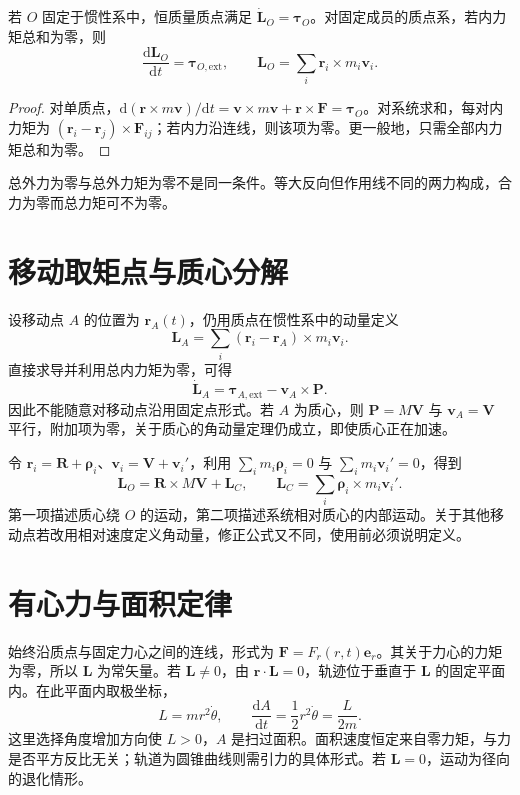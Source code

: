 \documentclass[UTF8,12pt,a4paper,fontset=fandol]{ctexbook}
\begin{document}
\begin{theorem}[关于惯性系固定点的角动量定理]
若 $O$ 固定于惯性系中，恒质量质点满足 $\dot{\mathbf L}_O=\boldsymbol\tau_O$。对固定成员的质点系，若内力矩总和为零，则
\begin{equation}
 \frac{\mathrm d\mathbf L_O}{\mathrm dt}=\boldsymbol\tau_{O,\mathrm{ext}},\qquad
 \mathbf L_O=\sum_i\mathbf r_i\times m_i\mathbf v_i.
 \label{eq:mech-angular-balance}
\end{equation}
\end{theorem}
\begin{proof}
对单质点，$\mathrm d(\mathbf r\times m\mathbf v)/\mathrm dt=\mathbf v\times m\mathbf v+\mathbf r\times\mathbf F=\boldsymbol\tau_O$。对系统求和，每对内力矩为 $(\mathbf r_i-\mathbf r_j)\times\mathbf F_{ij}$；若内力沿连线，则该项为零。更一般地，只需全部内力矩总和为零。
\end{proof}
总外力为零与总外力矩为零不是同一条件。等大反向但作用线不同的两力构成，合力为零而总力矩可不为零。

\section{移动取矩点与质心分解}
设移动点 $A$ 的位置为 $\mathbf r_A(t)$，仍用质点在惯性系中的动量定义
\[
 \mathbf L_A=\sum_i(\mathbf r_i-\mathbf r_A)\times m_i\mathbf v_i.
\]
直接求导并利用总内力矩为零，可得
\begin{equation}
 \dot{\mathbf L}_A=\boldsymbol\tau_{A,\mathrm{ext}}-\mathbf v_A\times\mathbf P.
 \label{eq:mech-moving-origin}
\end{equation}
因此不能随意对移动点沿用固定点形式。若 $A$ 为质心，则 $\mathbf P=M\mathbf V$ 与 $\mathbf v_A=\mathbf V$ 平行，附加项为零，关于质心的角动量定理仍成立，即使质心正在加速。

令 $\mathbf r_i=\mathbf R+\boldsymbol\rho_i$、$\mathbf v_i=\mathbf V+\mathbf v_i'$，利用 $\sum_i m_i\boldsymbol\rho_i=0$ 与 $\sum_i m_i\mathbf v_i'=0$，得到
\begin{equation}
 \mathbf L_O=\mathbf R\times M\mathbf V+\mathbf L_C,\qquad
 \mathbf L_C=\sum_i\boldsymbol\rho_i\times m_i\mathbf v_i'.
 \label{eq:mech-angular-decomposition}
\end{equation}
第一项描述质心绕 $O$ 的运动，第二项描述系统相对质心的内部运动。关于其他移动点若改用相对速度定义角动量，修正公式又不同，使用前必须说明定义。

\section{有心力与面积定律}
始终沿质点与固定力心之间的连线，形式为 $\mathbf F=F_r(r,t)\mathbf e_r$。其关于力心的力矩为零，所以 $\mathbf L$ 为常矢量。若 $\mathbf L\ne0$，由 $\mathbf r\cdot\mathbf L=0$，轨迹位于垂直于 $\mathbf L$ 的固定平面内。在此平面内取极坐标，
\[
 L=mr^2\dot\theta,\qquad \frac{\mathrm dA}{\mathrm dt}=\frac12r^2\dot\theta=\frac{L}{2m}.
\]
这里选择角度增加方向使 $L>0$，$A$ 是扫过面积。面积速度恒定来自零力矩，与力是否平方反比无关；轨道为圆锥曲线则需引力的具体形式。若 $\mathbf L=0$，运动为径向的退化情形。
\end{document}
